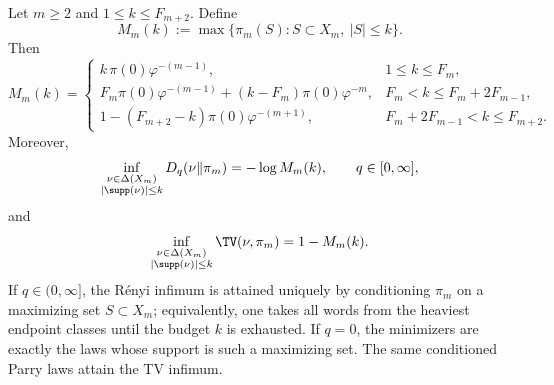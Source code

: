 \begin{theorem}\label{thm:parry-support-barrier}
Let \(m\ge 2\) and \(1\le k\le F_{m+2}\). Define
\[
M_m(k):=\max\{\pi_m(S):S\subset X_m,\ |S|\le k\}.
\]
Then
\[
M_m(k)=
\begin{cases}
k\,\pi(0)\varphi^{-(m-1)},
& 1\le k\le F_m,\\[0.4em]
F_m\pi(0)\varphi^{-(m-1)}+(k-F_m)\pi(0)\varphi^{-m},
& F_m<k\le F_m+2F_{m-1},\\[0.4em]
1-(F_{m+2}-k)\pi(0)\varphi^{-(m+1)},
& F_m+2F_{m-1}<k\le F_{m+2}.
\end{cases}
\]
Moreover,
\[
\inf_{\substack{\nu\in\Delta(X_m)\\ |\supp(\nu)|\le k}}D_q(\nu\|\pi_m)
=
-\log M_m(k),
\qquad q\in[0,\infty],
\]
and
\[
\inf_{\substack{\nu\in\Delta(X_m)\\ |\supp(\nu)|\le k}}\TV(\nu,\pi_m)
=
1-M_m(k).
\]
If \(q\in(0,\infty]\), the R\'enyi infimum is attained uniquely by conditioning
\(\pi_m\) on a maximizing set \(S\subset X_m\); equivalently, one takes all
words from the heaviest endpoint classes until the budget \(k\) is exhausted.
If \(q=0\), the minimizers are exactly the laws whose support is such a
maximizing set. The same conditioned Parry laws attain the TV infimum.
\end{theorem}

